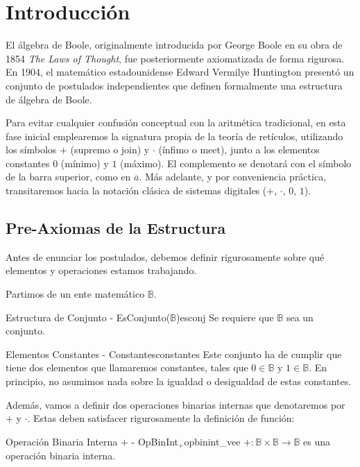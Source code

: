 \chapter{Introducción}
El álgebra de Boole, originalmente introducida por George Boole en su obra de 1854 \textit{The Laws of Thought}, fue posteriormente axiomatizada de forma rigurosa. En 1904, el matemático estadounidense Edward Vermilye Huntington presentó un conjunto de postulados independientes que definen formalmente una estructura de álgebra de Boole. 

Para evitar cualquier confusión conceptual con la aritmética tradicional, en esta fase inicial emplearemos la signatura propia de la teoría de retículos, utilizando los símbolos $+$ (supremo o join) y $\cdot$ (ínfimo o meet), junto a los elementos constantes $0$ (mínimo) y $1$ (máximo). El complemento se denotará con el símbolo de la barra superior, como en $\overline{a}$. Más adelante, y por conveniencia práctica, transitaremos hacia la notación clásica de sistemas digitales ($+$, $\cdot$, $0$, $1$).

\section{Pre-Axiomas de la Estructura}
Antes de enunciar los postulados, debemos definir rigurosamente sobre qué elementos y operaciones estamos trabajando. 

Partimos de un ente matemático $\mathbb{B}$.

\begin{preaxioma}{Estructura de Conjunto - EsConjunto($\mathbb{B}$)}{esconj}
Se requiere que $\mathbb{B}$ sea un conjunto.
\end{preaxioma}

\begin{preaxioma}{Elementos Constantes - Constantes}{constantes}
Este conjunto ha de cumplir que tiene dos elementos que llamaremos constantes, tales que $0 \in \mathbb{B}$ y $1 \in \mathbb{B}$. En principio, no asumimos nada sobre la igualdad o desigualdad de estas constantes.
\end{preaxioma}

Además, vamos a definir dos operaciones binarias internas que denotaremos por $+$ y $\cdot$. Estas deben satisfacer rigurosamente la definición de función:

\begin{preaxioma}{Operación Binaria Interna $+$ - OpBinInt$_+$}{opbinint_vee}
$+ : \mathbb{B} \times \mathbb{B} \to \mathbb{B}$ es una operación binaria interna.
\end{preaxioma}

